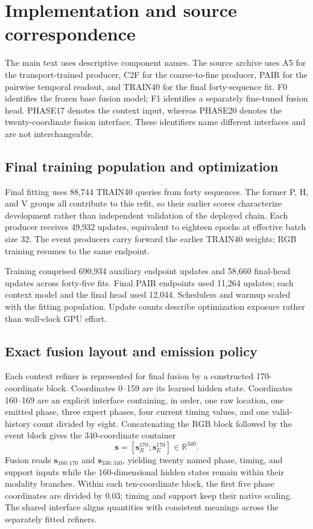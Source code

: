 \section{Implementation and source correspondence}
\label{app:implementation}
The main text uses descriptive component names. The source archive uses A5 for the transport-trained producer, C2F for the coarse-to-fine producer, PAIR for the pairwise temporal readout, and TRAIN40 for the final forty-sequence fit. F0 identifies the frozen base fusion model; F1 identifies a separately fine-tuned fusion head. PHASE17 denotes the context input, whereas PHASE20 denotes the twenty-coordinate fusion interface. These identifiers name different interfaces and are not interchangeable.

\subsection{Final training population and optimization}
Final fitting uses 88,744 TRAIN40 queries from forty sequences. The former P, H, and V groups all contribute to this refit, so their earlier scores characterize development rather than independent validation of the deployed chain. Each producer receives 49,932 updates, equivalent to eighteen epochs at effective batch size 32. The event producers carry forward the earlier TRAIN40 weights; RGB training resumes to the same endpoint. 

Training comprised 690,934 auxiliary endpoint updates and 58,660 final-head updates across forty-five fits. Final PAIR endpoints used 11,264 updates; each context model and the final head used 12,044. Schedulers and warmup scaled with the fitting population. Update counts describe optimization exposure rather than wall-clock GPU effort.

\subsection{Exact fusion layout and emission policy}

Each context refiner is represented for final fusion by a constructed 170-coordinate block. Coordinates 0--159 are its learned hidden state. Coordinates 160--169 are an explicit interface containing, in order, one raw location, one emitted phase, three expert phases, four current timing values, and one valid-history count divided by eight. Concatenating the RGB block followed by the event block gives the 340-coordinate container
\begin{equation}
  \mathbf{s}=\left[\mathbf{s}_{R}^{170};\mathbf{s}_{E}^{170}\right]\in\mathbb{R}^{340}.
\end{equation}
Fusion reads \(\mathbf{s}_{160:170}\) and \(\mathbf{s}_{330:340}\), yielding twenty named phase, timing, and support inputs while the 160-dimensional hidden states remain within their modality branches. Within each ten-coordinate block, the first five phase coordinates are divided by \(0.03\); timing and support keep their native scaling. The shared interface aligns quantities with consistent meanings across the separately fitted refiners. 

